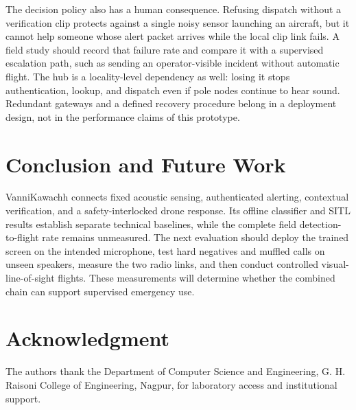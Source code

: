 \documentclass[conference]{IEEEtran}
\begin{document}
The decision policy also has a human consequence. Refusing dispatch without a verification clip protects against a single noisy sensor launching an aircraft, but it cannot help someone whose alert packet arrives while the local clip link fails. A field study should record that failure rate and compare it with a supervised escalation path, such as sending an operator-visible incident without automatic flight. The hub is a locality-level dependency as well: losing it stops authentication, lookup, and dispatch even if pole nodes continue to hear sound. Redundant gateways and a defined recovery procedure belong in a deployment design, not in the performance claims of this prototype.

\section{Conclusion and Future Work}
\label{sec:conclusion}
VanniKawachh connects fixed acoustic sensing, authenticated alerting, contextual verification, and a safety-interlocked drone response. Its offline classifier and SITL results establish separate technical baselines, while the complete field detection-to-flight rate remains unmeasured. The next evaluation should deploy the trained screen on the intended microphone, test hard negatives and muffled calls on unseen speakers, measure the two radio links, and then conduct controlled visual-line-of-sight flights. These measurements will determine whether the combined chain can support supervised emergency use.

\section*{Acknowledgment}
The authors thank the Department of Computer Science and Engineering, G. H. Raisoni College of Engineering, Nagpur, for laboratory access and institutional support.
\end{document}
